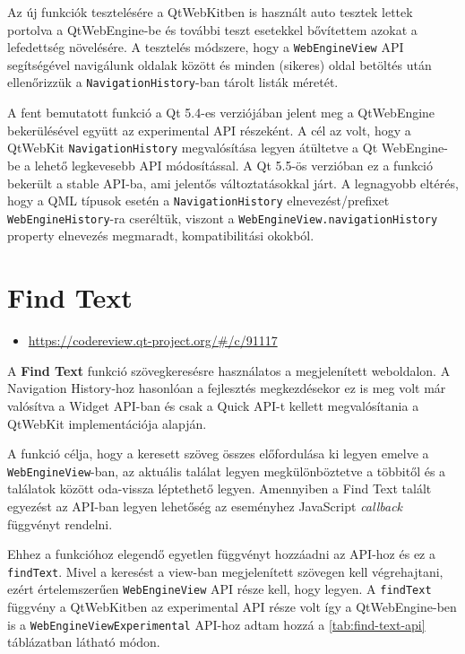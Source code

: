 \documentclass[12pt]{report}
\let\origurl\url
\renewcommand{\url}[1]{%
    \textcolor{blue}{\origurl{#1}}
}
\newcommand{\gerrit}[1]{%
    \textcolor{qtgreen}{\origurl{https://codereview.qt-project.org/\#/c/#1}}
}
\begin{document}
Az új funkciók tesztelésére a QtWebKitben is használt auto tesztek lettek portolva a
QtWebEngine-be és további teszt esetekkel bővítettem azokat a lefedettség növelésére.
A tesztelés módszere, hogy a \texttt{WebEngineView} API segítségével navigálunk oldalak
között és minden (sikeres) oldal betöltés után ellenőrizzük a \texttt{NavigationHistory}-ban
tárolt listák méretét.

A fent bemutatott funkció a Qt 5.4-es verziójában jelent meg a QtWebEngine bekerülésével
együtt az experimental API részeként. A cél az volt, hogy a QtWebKit
\texttt{NavigationHistory} megvalósítása legyen átültetve a Qt WebEngine-be a lehető
legkevesebb API módosítással. A Qt 5.5-ös verzióban ez a funkció bekerült a stable API-ba, ami
jelentős változtatásokkal járt. A legnagyobb eltérés, hogy a QML típusok esetén a
\texttt{NavigationHistory} elnevezést/prefixet \texttt{WebEngineHistory}-ra cseréltük,
viszont a \texttt{WebEngineView.navigationHistory} property elnevezés megmaradt,
kompatibilitási okokból.


\section{Find Text}

\begin{center}
    \begin{reviewbox}
        \begin{itemize}
            \renewcommand{\labelitemi}{\textcolor{qtgreen}{$\blacktriangleright$}}
            \item \gerrit{91117}
        \end{itemize}
    \end{reviewbox}
\end{center}

\noindent
A \textbf{Find Text} funkció szövegkeresésre használatos a megjelenített weboldalon. A
Navigation History-hoz hasonlóan a fejlesztés megkezdésekor ez is meg volt már valósítva
a Widget API-ban és csak a Quick API-t kellett megvalósítania a QtWebKit implementációja
alapján.

A funkció célja, hogy a keresett szöveg összes előfordulása ki legyen emelve a
\texttt{WebEngineView}-ban, az aktuális találat legyen megkülönböztetve a többitől és a
találatok között oda-vissza léptethető legyen. Amennyiben a Find Text talált egyezést
az API-ban legyen lehetőség az eseményhez JavaScript \textit{callback} függvényt rendelni.

Ehhez a funkcióhoz elegendő egyetlen függvényt hozzáadni az API-hoz és ez a
\texttt{findText}. Mivel a keresést a view-ban megjelenített szövegen kell végrehajtani,
ezért értelemszerűen \texttt{WebEngineView} API része kell, hogy legyen. A \texttt{findText}
függvény a QtWebKitben az experimental API része volt így a QtWebEngine-ben is a
\texttt{WebEngineViewExperimental} API-hoz adtam hozzá a \ref{tab:find-text-api}
táblázatban látható módon.
\end{document}
